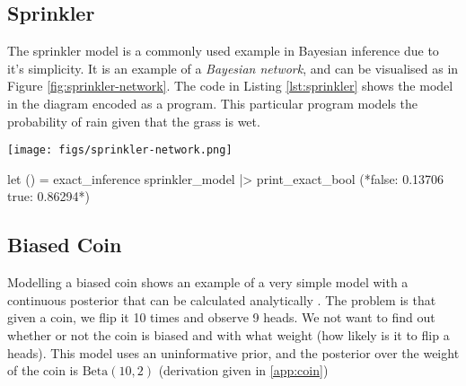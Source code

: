 \documentclass[sigconf]{acmart}
\begin{document}
\subsection{Sprinkler}
The sprinkler model is a commonly used example in Bayesian inference due to it's simplicity. It is an example of a \textit{Bayesian network}, and can be visualised as in Figure \ref{fig:sprinkler-network}. The code in Listing \ref{lst:sprinkler} shows the model in the diagram encoded as a program. This particular program models the probability of rain given that the grass is wet.

\begin{figure*}[!htb]
  \centering
  \begin{minipage}{0.47\linewidth}
    \label{lst:sprinkler}
  \end{minipage}
  \begin{minipage}{0.47\linewidth}
    \texttt{[image: figs/sprinkler-network.png]}
    \label{fig:sprinkler-network}
    \vspace{0.3cm}
    \begin{ocamlcode-in}
      let () =
      exact_inference sprinkler_model
      |> print_exact_bool
      (*false: 0.13706 true: 0.86294*)
    \end{ocamlcode-in}
    \label{lst:inf-output}
  \end{minipage}
\end{figure*}

\subsection{Biased Coin} \label{sec:coin}
Modelling a biased coin shows an example of a very simple model with a continuous posterior that can be calculated analytically \cite{datasci}. The problem is that given a coin, we flip it 10 times and observe 9 heads. We not want to find out whether or not the coin is biased and with what weight (how likely is it to flip a heads). This model uses an uninformative prior, and the posterior over the weight of the coin is $\text{Beta}(10,2)$ (derivation given in \ref{app:coin})
\end{document}
